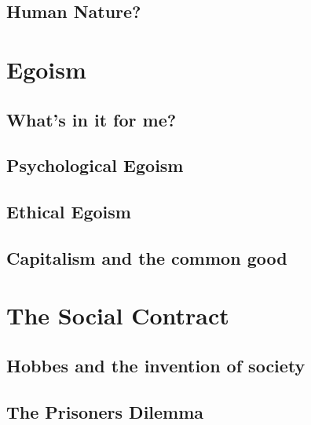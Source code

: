 \documentclass[justified]{tufte-book}
\begin{document}
\hypertarget{human-nature}{%
\section{Human Nature?}\label{human-nature}}

\hypertarget{egoism}{%
\chapter{Egoism}\label{egoism}}

\hypertarget{whats-in-it-for-me}{%
\section{What's in it for me?}\label{whats-in-it-for-me}}

\hypertarget{psychological-egoism}{%
\section{Psychological Egoism}\label{psychological-egoism}}

\hypertarget{ethical-egoism}{%
\section{Ethical Egoism}\label{ethical-egoism}}

\hypertarget{capitalism-and-the-common-good}{%
\section{Capitalism and the common good}\label{capitalism-and-the-common-good}}

\hypertarget{the-social-contract}{%
\chapter{The Social Contract}\label{the-social-contract}}

\hypertarget{hobbes-and-the-invention-of-society}{%
\section{Hobbes and the invention of society}\label{hobbes-and-the-invention-of-society}}

\hypertarget{the-prisoners-dilemma}{%
\section{The Prisoners Dilemma}\label{the-prisoners-dilemma}}
\end{document}
